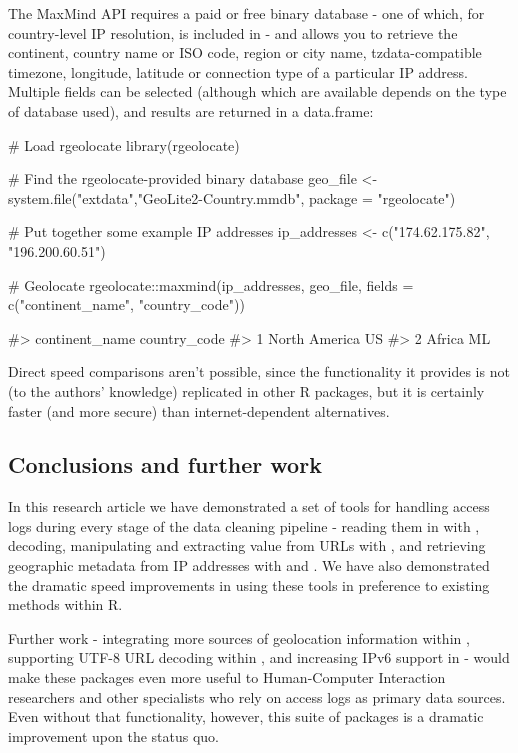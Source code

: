 The MaxMind API requires a paid or free binary database - one of which,
for country-level IP resolution, is included in  - and
allows you to retrieve the continent, country name or ISO code, region
or city name, tzdata-compatible timezone, longitude, latitude or
connection type of a particular IP address. Multiple fields can be
selected (although which are available depends on the type of database
used), and results are returned in a data.frame:

\begin{Schunk}
\begin{Sinput}
# Load rgeolocate
library(rgeolocate)

# Find the rgeolocate-provided binary database
geo_file <- system.file("extdata","GeoLite2-Country.mmdb", package = "rgeolocate")

# Put together some example IP addresses
ip_addresses <- c("174.62.175.82", "196.200.60.51")

# Geolocate
rgeolocate::maxmind(ip_addresses, geo_file, fields = c("continent_name", "country_code"))
\end{Sinput}
\begin{Soutput}
#>   continent_name country_code
#> 1  North America           US
#> 2         Africa           ML
\end{Soutput}
\end{Schunk}

Direct speed comparisons aren't possible, since the functionality it
provides is not (to the authors' knowledge) replicated in other R
packages, but it is certainly faster (and more secure) than
internet-dependent alternatives.

\subsection{Conclusions and further
work}\label{conclusions-and-further-work}

In this research article we have demonstrated a set of tools for
handling access logs during every stage of the data cleaning pipeline -
reading them in with , decoding, manipulating and
extracting value from URLs with , and retrieving
geographic metadata from IP addresses with  and
. We have also demonstrated the dramatic speed
improvements in using these tools in preference to existing methods
within R.

Further work - integrating more sources of geolocation information
within , supporting UTF-8 URL decoding within
, and increasing IPv6 support in  - would
make these packages even more useful to Human-Computer Interaction
researchers and other specialists who rely on access logs as primary
data sources. Even without that functionality, however, this suite of
packages is a dramatic improvement upon the status quo.

